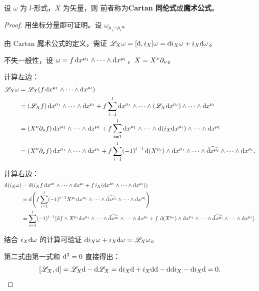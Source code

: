 \begin{theorem}[Cartan]
    设 $\omega$ 为 $l$-形式，$X$ 为矢量，则
    前者称为\textbf{Cartan 同伦式}或\textbf{魔术公式}。
\end{theorem}
\begin{proof}
    用坐标分量即可证明。设 $\omega_{\mu_1\cdots\mu_l}$。

    由 Cartan 魔术公式的定义，需证 $\mathscr L_X\omega=[\dd,i_X]\omega=\dd i_X\omega+i_X\dd\omega$。

    不失一般性，设 $\omega=f\,\dd x^{\mu_1}\wedge\cdots\wedge\dd x^{\mu_l}$，$X=X^\nu\partial_\nu$。

    计算左边：
    \begin{align*}
        \mathscr L_X\omega&=\mathscr L_X(f\,\dd x^{\mu_1}\wedge\cdots\wedge\dd x^{\mu_l})\\
        &=(\mathscr L_X f)\,\dd x^{\mu_1}\wedge\cdots\wedge\dd x^{\mu_l}+f\sum_{i=1}^l\dd x^{\mu_1}\wedge\cdots\wedge(\mathscr L_X\dd x^{\mu_i})\wedge\cdots\wedge\dd x^{\mu_l}\\
        &=(X^\nu\partial_\nu f)\,\dd x^{\mu_1}\wedge\cdots\wedge\dd x^{\mu_l}+f\sum_{i=1}^l\dd x^{\mu_1}\wedge\cdots\wedge\dd(i_X\dd x^{\mu_i})\wedge\cdots\wedge\dd x^{\mu_l}\\
        &=(X^\nu\partial_\nu f)\,\dd x^{\mu_1}\wedge\cdots\wedge\dd x^{\mu_l}+f\sum_{i=1}^l(-1)^{i-1}\dd(X^{\mu_i})\wedge\dd x^{\mu_1}\wedge\cdots\wedge\widehat{\dd x^{\mu_i}}\wedge\cdots\wedge\dd x^{\mu_l}.
    \end{align*}

    计算右边：
    \begin{align*}
        \dd(i_X\omega)&=\dd(i_X f\,\dd x^{\mu_1}\wedge\cdots\wedge\dd x^{\mu_l}+f\,i_X(\dd x^{\mu_1}\wedge\cdots\wedge\dd x^{\mu_l}))\\
        &=\dd(f\sum_{i=1}^l(-1)^{i-1}X^{\mu_i}\dd x^{\mu_1}\wedge\cdots\wedge\widehat{\dd x^{\mu_i}}\wedge\cdots\wedge\dd x^{\mu_l})\\
        &=\sum_{i=1}^l(-1)^{i-1}[\dd f\wedge X^{\mu_i}\dd x^{\mu_1}\wedge\cdots\wedge\widehat{\dd x^{\mu_i}}\wedge\cdots\wedge\dd x^{\mu_l}+f\,\dd(X^{\mu_i})\wedge\dd x^{\mu_1}\wedge\cdots\wedge\widehat{\dd x^{\mu_i}}\wedge\cdots\wedge\dd x^{\mu_l}].
    \end{align*}

    结合 $i_X\dd\omega$ 的计算可验证 $\dd i_X\omega+i_X\dd\omega=\mathscr L_X\omega$。

    第二式由第一式和 $\dd^2=0$ 直接得出：
    \[[\mathscr L_X,\dd]=\mathscr L_X\dd-\dd\mathscr L_X=\dd i_X\dd+i_X\dd\dd-\dd\dd i_X-\dd i_X\dd=0.\qedhere\]
\end{proof}


